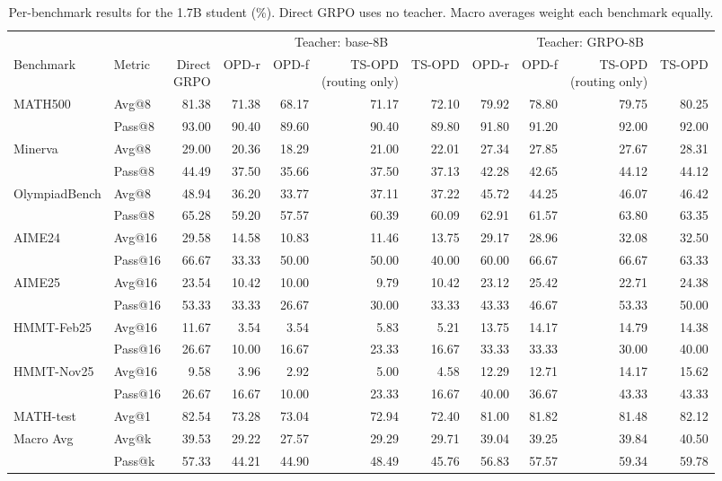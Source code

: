 \begin{table}[h]
\centering
\scriptsize
\setlength{\tabcolsep}{3.5pt}
\caption{Per-benchmark results for the 1.7B student (\%). Direct GRPO uses no teacher. Macro averages weight each benchmark equally.}
\label{tab:app-full-17B}
\begin{tabular}{llrrrrrrrrr}
\toprule
 & & & \multicolumn{4}{c}{Teacher: base-8B} & \multicolumn{4}{c}{Teacher: GRPO-8B} \\
\cmidrule(lr){4-7}\cmidrule(lr){8-11}
Benchmark & Metric & \shortstack{Direct\\GRPO} & OPD-r & OPD-f & \shortstack{TS-OPD\\(routing only)} & TS-OPD & OPD-r & OPD-f & \shortstack{TS-OPD\\(routing only)} & TS-OPD \\
\midrule
MATH500 & Avg@8 & 81.38 & 71.38 & 68.17 & 71.17 & 72.10 & 79.92 & 78.80 & 79.75 & 80.25 \\
 & Pass@8 & 93.00 & 90.40 & 89.60 & 90.40 & 89.80 & 91.80 & 91.20 & 92.00 & 92.00 \\
Minerva & Avg@8 & 29.00 & 20.36 & 18.29 & 21.00 & 22.01 & 27.34 & 27.85 & 27.67 & 28.31 \\
 & Pass@8 & 44.49 & 37.50 & 35.66 & 37.50 & 37.13 & 42.28 & 42.65 & 44.12 & 44.12 \\
OlympiadBench & Avg@8 & 48.94 & 36.20 & 33.77 & 37.11 & 37.22 & 45.72 & 44.25 & 46.07 & 46.42 \\
 & Pass@8 & 65.28 & 59.20 & 57.57 & 60.39 & 60.09 & 62.91 & 61.57 & 63.80 & 63.35 \\
AIME24 & Avg@16 & 29.58 & 14.58 & 10.83 & 11.46 & 13.75 & 29.17 & 28.96 & 32.08 & 32.50 \\
 & Pass@16 & 66.67 & 33.33 & 50.00 & 50.00 & 40.00 & 60.00 & 66.67 & 66.67 & 63.33 \\
AIME25 & Avg@16 & 23.54 & 10.42 & 10.00 & 9.79 & 10.42 & 23.12 & 25.42 & 22.71 & 24.38 \\
 & Pass@16 & 53.33 & 33.33 & 26.67 & 30.00 & 33.33 & 43.33 & 46.67 & 53.33 & 50.00 \\
HMMT-Feb25 & Avg@16 & 11.67 & 3.54 & 3.54 & 5.83 & 5.21 & 13.75 & 14.17 & 14.79 & 14.38 \\
 & Pass@16 & 26.67 & 10.00 & 16.67 & 23.33 & 16.67 & 33.33 & 33.33 & 30.00 & 40.00 \\
HMMT-Nov25 & Avg@16 & 9.58 & 3.96 & 2.92 & 5.00 & 4.58 & 12.29 & 12.71 & 14.17 & 15.62 \\
 & Pass@16 & 26.67 & 16.67 & 10.00 & 23.33 & 16.67 & 40.00 & 36.67 & 43.33 & 43.33 \\
MATH-test & Avg@1 & 82.54 & 73.28 & 73.04 & 72.94 & 72.40 & 81.00 & 81.82 & 81.48 & 82.12 \\
\midrule
Macro Avg & Avg@k & 39.53 & 29.22 & 27.57 & 29.29 & 29.71 & 39.04 & 39.25 & 39.84 & 40.50 \\
 & Pass@k & 57.33 & 44.21 & 44.90 & 48.49 & 45.76 & 56.83 & 57.57 & 59.34 & 59.78 \\
\bottomrule
\end{tabular}
\end{table}
